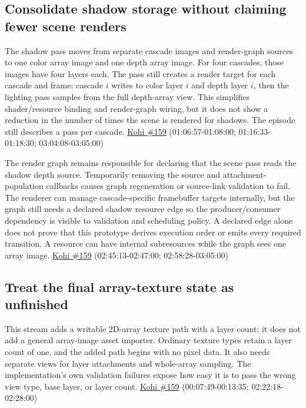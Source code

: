 \subsection{Consolidate shadow storage without claiming fewer scene renders}\label{06-engine-ii-ch026-consolidate-shadow-storage-without-claiming-fewer-scene-renders}

The shadow pass moves from separate cascade images and render-graph sources to one color array image and one depth array image. For four cascades, those images have four layers each. The pass still creates a render target for each cascade and frame: cascade \(i\) writes to color layer \(i\) and depth layer \(i\), then the lighting pass samples from the full depth-array view. This simplifies shader/resource binding and render-graph wiring, but it does not show a reduction in the number of times the scene is rendered for shadows. The episode still describes a pass per cascade. \href{https://www.youtube.com/watch?v=FrtHF-9K1HI}{Kohi \#159} (01:06:57-01:08:00; 01:16:33-01:18:30; 03:04:08-03:05:00)

The render graph remains responsible for declaring that the scene pass reads the shadow depth source. Temporarily removing the source and attachment-population callbacks causes graph regeneration or source-link validation to fail. The renderer can manage cascade-specific framebuffer targets internally, but the graph still needs a declared shadow resource edge so the producer/consumer dependency is visible to validation and scheduling policy. A declared edge alone does not prove that this prototype derives execution order or emits every required transition. A resource can have internal subresources while the graph sees one array image. \href{https://www.youtube.com/watch?v=FrtHF-9K1HI}{Kohi \#159} (02:45:13-02:47:00; 02:58:28-03:05:00)

\subsection{Treat the final array-texture state as unfinished}\label{06-engine-ii-ch026-treat-the-final-array-texture-state-as-unfinished}

This stream adds a writable 2D-array texture path with a layer count; it does not add a general array-image asset importer. Ordinary texture types retain a layer count of one, and the added path begins with no pixel data. It also needs separate views for layer attachments and whole-array sampling. The implementation's own validation failures expose how easy it is to pass the wrong view type, base layer, or layer count. \href{https://www.youtube.com/watch?v=FrtHF-9K1HI}{Kohi \#159} (00:07:49-00:13:35; 02:22:18-02:28:00)


